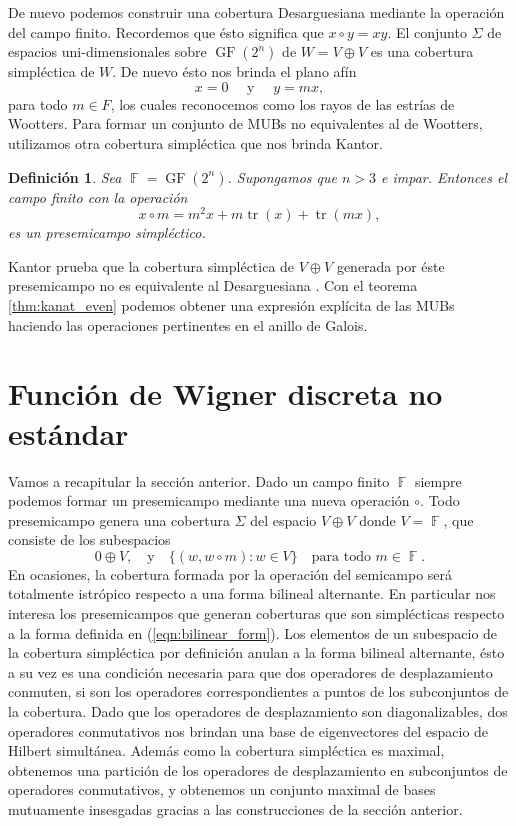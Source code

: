 \documentclass[a4paper]{report}
\DeclareMathOperator{\F}{\mathbb{F}}
\DeclareMathOperator{\tr}{tr}
\DeclareMathOperator{\GF}{GF}
\newtheorem{definition}{Definición}
\begin{document}
  De nuevo podemos construir una cobertura Desarguesiana
  mediante la operación del campo finito. Recordemos que
  ésto significa que $x \circ y = xy$. El conjunto $\Sigma$
  de espacios uni-dimensionales sobre $\GF(2^{n})$ de $W = V
  \oplus V$ es una cobertura simpléctica de $W$.  De nuevo
  ésto nos brinda el plano afín
  \[
    x = 0
    \quad \text{ y } \quad
    y = mx,
  \]
  para todo $m \in F$, los cuales reconocemos como los rayos
  de las estrías de Wootters. Para formar un conjunto de
  MUBs no equivalentes al de Wootters, utilizamos otra
  cobertura simpléctica que nos brinda Kantor.
  \begin{definition}
    \label{def:kantor_even_alt}
    Sea $\F = \GF(2^{n})$. Supongamos que $n >
    3$ e impar. Entonces el campo finito con la operación
    \begin{equation}
      x \circ m
      = m^2x + m\tr(x) + \tr(mx),
    \end{equation}
    es un presemicampo simpléctico.
  \end{definition}
  Kantor prueba que la cobertura simpléctica de $V \oplus V$
  generada por éste presemicampo no es equivalente al
  Desarguesiana \cite{kantor2012}. Con el teorema
  \ref{thm:kanat_even} podemos obtener una expresión
  explícita de las MUBs haciendo las operaciones pertinentes
  en el anillo de Galois.

  \section{Función de Wigner discreta no estándar}

  Vamos a recapitular la sección anterior. Dado un campo
  finito $\F$ siempre podemos formar un presemicampo
  mediante una nueva operación $\circ$. Todo presemicampo
  genera una cobertura $\Sigma$ del espacio $V \oplus V$
  donde $V = \F$, que consiste de los subespacios
  \[
    0 \oplus V,
    \quad
    \text{y}
    \quad
    \{(w, w \circ m) : w \in V\} 
    \quad \text{para todo } m \in \F.
  \] 
  En ocasiones, la cobertura formada por la operación del
  semicampo será totalmente istrópico respecto a una forma
  bilineal alternante. En particular nos interesa los
  presemicampos que generan coberturas que son simplécticas
  respecto a la forma definida en (\ref{eqn:bilinear_form}).
  Los elementos de un subespacio de la cobertura simpléctica
  por definición anulan a la forma bilineal alternante, ésto
  a su vez es una condición necesaria para que dos
  operadores de desplazamiento conmuten, si son los
  operadores correspondientes a puntos de los subconjuntos
  de la cobertura.  Dado que los operadores de
  desplazamiento son diagonalizables, dos operadores
  conmutativos nos brindan una base de eigenvectores del
  espacio de Hilbert simultánea. Además como la cobertura
  simpléctica es maximal, obtenemos una partición de los
  operadores de desplazamiento en subconjuntos de operadores
  conmutativos, y obtenemos un conjunto maximal de bases
  mutuamente insesgadas gracias a las construcciones de la
  sección anterior.
\end{document}
